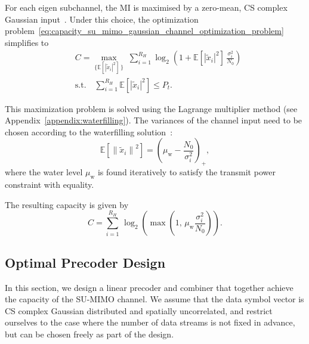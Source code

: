 For each eigen subchannel, the \acf{MI} is maximised by a zero-mean, \ac{CS} complex Gaussian input~\cite{telatar_1999}. Under this choice, the optimization problem~\eqref{eq:capacity_su_mimo_gaussian_channel_optimization_problem} simplifies to
\begin{equation}
\label{eq:capacity_su_mimo_gaussian_channel_optimization_problem_simplified}
\begin{aligned}
    & C = \max_{\{\mathbb{E}\left[|\tilde{x}_i|^2\right] \, \}} \; \sum_{i=1}^{R_H} \log_2\!\left(1 + \mathbb{E}\left[|\tilde{x}_i|^2\right] \, \frac{\sigma^2_i}{N_0} \right) \\
    & \text{s.t.} \quad \sum_{i=1}^{R_H} \mathbb{E}\left[|\tilde{x}_i|^2\right] \leq P_t.
\end{aligned}
\end{equation}

This maximization problem is solved using the Lagrange multiplier method (see Appendix~\ref{appendix:waterfilling}).
The variances of the channel input need to be chosen according to the waterfilling solution~\cite{gallager_1968}:
\begin{equation}
    \mathbb{E}\left[\left\|\tilde{x}_i\right\|^2\right] = \left(\mu_{\text{w}} - \frac{N_0}{\sigma^2_i}\right)_{+},
\end{equation}
where the water level $\mu_{\text{w}}$ is found iteratively to satisfy the transmit power constraint with equality.

The resulting capacity is given by
\begin{equation}
\label{eq:capacity_su_mimo_gaussian_channel}
    C = \sum_{i=1}^{R_H} \, \log_2\!\left( \max(1, \, \mu_{\text{w}} \frac{\sigma^2_i}{N_0}) \right).
\end{equation}

\subsection{Optimal Precoder Design}
\label{subsection:optimal_precoder_design}

In this section, we design a linear precoder and combiner that together achieve the capacity of the \ac{SU}-\ac{MIMO} channel.
We assume that the data symbol vector is \ac{CS} complex Gaussian distributed and spatially uncorrelated, and restrict ourselves to the case where the number of data streams is not fixed in advance, but can be chosen freely as part of the design.

